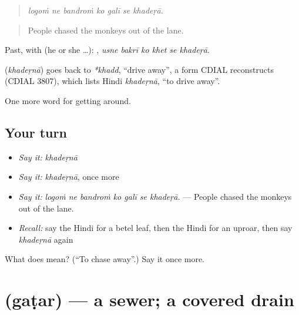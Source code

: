\begin{quote}
      
\end{quote}

\begin{quote}
\emph{logoṁ ne bandroṁ ko galī se khadeṛā.}
\end{quote}

\begin{quote}
People chased the monkeys out of the lane.
\end{quote}

Past, with  (he or she …):      , \emph{usne bakrī ko khet se khadeṛā}.

\begin{cousinweb}
\textbf{} (\emph{khadeṛnā}) goes back to \emph{*khadd}, \textquotedblleft{}drive away\textquotedblright{}, a form CDIAL reconstructs (CDIAL 3807), which lists Hindi \emph{khadeṛnā}, \textquotedblleft{}to drive away\textquotedblright{}.
\end{cousinweb}

\begin{grammarlens}[title={What you've built}]
One more word for getting around.
\end{grammarlens}

\subsection*{Your turn}
\begin{itemize}
\raggedright
  \item \emph{Say it:} \emph{khadeṛnā}
  \item \emph{Say it:} \emph{khadeṛnā}, once more
  \item \emph{Say it:} \emph{logoṁ ne bandroṁ ko galī se khadeṛā.} — People chased the monkeys out of the lane.
  \item \emph{Recall:} say the Hindi for a betel leaf, then the Hindi for an uproar, then say \emph{khadeṛnā} again
\end{itemize}

\begin{tcolorbox}[breakable,colback=teal!4,colframe=teal!35!black,title={Before you move on}]
What does  mean? (\textquotedblleft{}To chase away\textquotedblright{}.) Say it once more.
\end{tcolorbox}
\section[\texorpdfstring{\hi{गटर} (gaṭar)}{गटर (gaṭar)}]{ (gaṭar) — a sewer; a covered drain}

